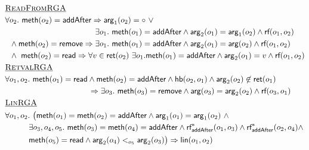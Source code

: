 \begin{align*}
  & \text{\underline{\sc ReadFromRGA}} \\
  & \forall o_2.\ {\sf meth}(o_2)={\sf addAfter} \implies {\sf arg}_1(o_2) = \circ\ \vee\\
  & \hspace{4cm}\exists o_1.\ {\sf meth}(o_1)={\sf addAfter}\land {\sf arg}_2(o_1)={\sf arg}_1(o_2) \land \rf(o_1,o_2)\  \\
  & \hspace{.2cm} \land {\sf meth}(o_2)={\sf remove} \implies \exists o_1.\  {\sf meth}(o_1)={\sf addAfter}\land {\sf arg}_2(o_1)={\sf arg}(o_2) \land \rf(o_1,o_2)\  \\
  & \hspace{.2cm} \land\ {\sf meth}(o_2)={\sf read} \implies \forall v\in {\sf ret}(o_2)\ \exists o_1.{\sf meth}(o_1)={\sf addAfter}\land {\sf arg}_2(o_1)=v \land \rf(o_1,o_2)
  \\
  & \text{\underline{\sc RetvalRGA}} \\
  & \forall o_1,o_2.\ {\sf meth}(o_1) = {\sf read}\land {\sf meth}(o_2) = {\sf addAfter}\land \hb(o_2,o_1)\land {\sf arg}_2(o_2)\not\in {\sf ret}(o_1) \\
  & \hspace{3.7cm}\implies \exists o_3.\ {\sf meth}(o_3) = {\sf remove}\land {\sf arg}(o_3)={\sf arg}_2(o_2)\land \rf(o_3,o_1)
  \\
  & \text{\underline{\sc LinRGA}} \\
  & \forall o_1, o_2.\ \big({\sf meth}(o_1) = {\sf meth}(o_2) = {\sf addAfter}\land {\sf arg}_1(o_1)={\sf arg}_1(o_2) \ \land \\
  &\hspace{1.05cm} \exists o_3,o_4,o_5.\ {\sf meth}(o_3) = {\sf meth}(o_4) = {\sf addAfter}\land \rf^*_{\sf addAfter}(o_1,o_3)\land \rf^*_{\sf addAfter}(o_2,o_4)\land \\
  &\hspace{1.05cm} {\sf meth}(o_5) = {\sf read}\land {\sf arg}_2(o_4) <_{o_5} {\sf arg}_2(o_3) \big) \implies \lin(o_1,o_2)
\end{align*}

